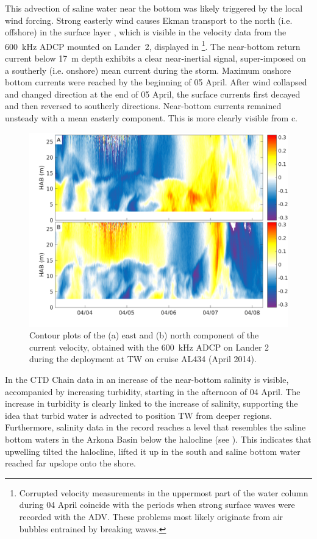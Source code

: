  This advection of saline water near the bottom was likely triggered by the 
local wind 
forcing. Strong easterly wind causes Ekman transport to the north (i.e. 
offshore) in the surface layer \citep[][]{lass2001}, 
which is visible in the 
velocity data from the 600~kHz ADCP mounted on Lander~2, displayed in 
\footnote{Corrupted velocity measurements in the uppermost part of 
the water column during 04 April coincide with the periods when strong surface 
waves were recorded with the ADV. These problems most likely originate from 
air bubbles entrained by breaking waves.}. The near-bottom return current below 
17~m depth exhibits a clear near-inertial signal, super-imposed on a southerly 
(i.e. onshore) mean current during the storm. Maximum onshore bottom currents 
were reached by the beginning of 05 April. After wind collapsed and changed 
direction at the end of 05 April, the surface currents 
first decayed and then reversed to southerly directions. Near-bottom 
currents remained unsteady with a mean easterly component. This is more clearly 
visible from c.

 \begin{figure}[ht]
\includegraphics[width=40pc]{bilder/adcp600.png}
 \caption{Contour plots of the (a) east and (b) north component of the 
current velocity, obtained with the 600~kHz ADCP on 
Lander 2 during the deployment at TW on cruise AL434 (April 2014).}
 \label{adcp600}
 \end{figure}
\FloatBarrier
 In the CTD Chain data in  an increase of the 
near-bottom salinity is visible, accompanied by increasing turbidity, starting 
in the 
afternoon of 04 April. The increase in turbidity is clearly linked to the 
increase of salinity, supporting the idea that turbid water is advected to 
position TW from deeper 
regions. Furthermore, salinity data in the record reaches a level that 
resembles the saline bottom waters in the Arkona Basin below the 
halocline (see ). This indicates that upwelling 
tilted the halocline, lifted it up in the south and saline bottom water 
reached far upslope onto the shore.


